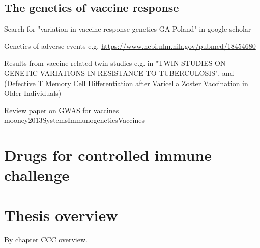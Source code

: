 \subsection{The genetics of vaccine response}

Search for "variation in vaccine response genetics GA Poland" in google scholar

Genetics of adverse events e.g. \url{https://www.ncbi.nlm.nih.gov/pubmed/18454680}

Results from vaccine-related twin studies e.g. in "TWIN STUDIES ON GENETIC VARIATIONS IN RESISTANCE TO TUBERCULOSIS", and (Defective T Memory Cell Differentiation after Varicella Zoster Vaccination in Older Individuals)

Review paper on GWAS for vaccines mooney2013SystemsImmunogeneticsVaccines

\section{Drugs for controlled immune challenge}

\section{Thesis overview}

By chapter CCC overview.
